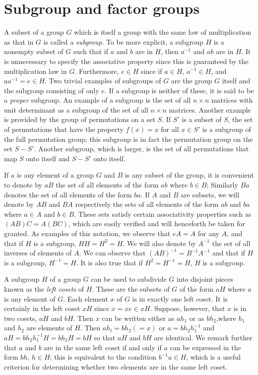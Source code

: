 \section{Subgroup and factor groups}

A subset of a group $G$ which is itself a group with the same law of multiplication as that in $G$ is called a \emph{subgroup}. To be more explicit, a subgroup $H$ is a nonempty subset of $G$ such that if $a$ and $b$ are in $H$, then $a^{-1}$ and $ab$ are in $H$. It is unnecessary to specify the associative property since this is guaranteed by the multiplication law in $G$. Furthermore, $e\in H$ since
if $a\in H$, $a^{-1}\in H$, and $aa^{-1} = e \in H$. Two trivial examples of subgroups of $G$ are the group $G$ itself and the subgroup consisting of only $e$. If a subgroup is neither of these, it is said to be a \emph{proper} subgroup. An example of a subgroup is the set of all $n \times n$ matrices with unit determinant as a subgroup of the set of all $n \times n$ matrices. Another example is provided by the group of permutations on a set $S$. If $S'$ is a subset of $S$, the set of permutations that have the property $f(x) = x$ for all $x \in S'$ is a subgroup of the full permutation group; this subgroup is in fact the permutation group on the set $S -S'$. Another subgroup, which is larger, is the set of all permutations that map $S$ onto itself and $S - S'$ onto itself.

If $a$ is any element of a group $G$ and $B$ is any subset of the group, it is convenient to denote by $aB$ the set of all elements of the form $ab$ where $b \in B$; Similarly $Ba$ denotes the set of all elements of the form $ba$. If $A$ and $B$ are subsets, we will denote by $AB$ and $BA$ respectively the sets of all elements of the form $ab$ and $ba$ where $a \in A$ and $b \in B$. These sets satisfy certain associativity properties such as $(AB) C = A (BC)$, which are easily verified and will henceforth be taken for granted. As examples of this notation, we observe that $eA = A$ for any $A$, and that if $H$ is a subgroup, $HH = H^{2} = H$. We will also denote by $A^{-1}$ the set of all inverses of elements of $A$. We can observe that $(AB)^{-1} = B^{-1}A^{-1}$ and that if $H$ is a subgroup, $H^{-1} = H$. It is also true that if $H^{2} = H^{-1} = H$, $H$ is a subgroup. 

A subgroup $H$ of a group $G$ can be used to subdivide $G$ into disjoint pieces known as the \emph{left cosets} of $H$. These are the subsets of
$G$ of the form $aH$ where $a$ is any element of $G$. Each element $x$ of $G$ is in exactly one left coset. It is certainly in the left coset $xH$ since $x = xe \in xH$. Suppose, however, that $x$ is in two cosets, $aH$ and $bH$. Then $x$ can be written either as $ah_{1}$ or as $bh_{2}$,where $h_{1}$ and $h_{2}$ are elements of $H$. Then $ah_{l} = bh_{2} (= x)$ or $a = bh_{2}h_{1}^{- 1}$ and $aH = bh_{2}h_{1}^{- 1}H = bh_{2}H = bH$ so that $aH$ and $bH$ are identical. We remark further that $a$ and $b$ are in the same left coset if and only if $a$ can be expressed in the form $bh$, $h \in H$; this is equivalent to the condition $b^{-1}a \in H$, which is a useful criterion for determining whether two elements are in the same left coset.

